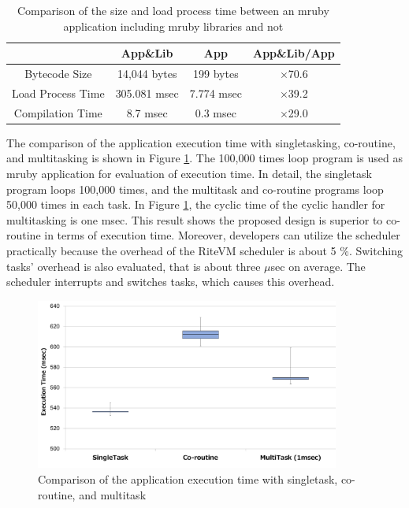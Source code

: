 \documentclass[a4j,12pt,oneside,openany,english]{jsbook}
\begin{document}
\begin{table}[t]
    \centering
    \caption{Comparison of the size and load process time between an mruby application including mruby libraries and not}
    \begin{tabular}{c||c|c|c}
                            & App\&Lib     & App        &   App\&Lib/App  \\ \hline
          Bytecode Size     & 14,044 bytes & 199 bytes  &   $\times$70.6          \\ %
          Load Process Time & 305.081 msec & 7.774 msec &   $\times$39.2          \\
          Compilation Time  & 8.7 msec     & 0.3 msec   &   $\times$29.0          \\
    \end{tabular}
    \label{tab:size_and_time}
\end{table}

The comparison of the application execution time with singletasking, co-routine, and multitasking is shown in Figure \ref{fig:comparison_s_c_m}.
The 100,000 times loop program is used as mruby application for evaluation of execution time.
In detail, the singletask program loops 100,000 times, and the multitask and co-routine programs loop 50,000 times in each task.
In Figure \ref{fig:comparison_s_c_m}, the cyclic time of the cyclic handler for multitasking is one msec.
This result shows the proposed design is superior to co-routine in terms of execution time.
Moreover, developers can utilize the scheduler practically because the overhead of the RiteVM scheduler is about 5 \%.
Switching tasks' overhead is also evaluated, that is about three $\mu$sec on average.
The scheduler interrupts and switches tasks, which causes this overhead.


\begin{figure}[t]
    \centering
    \includegraphics[width=10cm,clip]{../EMSOFT2016/figure/comparison_s_c_m.pdf}
    \caption{Comparison of the application execution time with singletask, co-routine, and multitask}
    \label{fig:comparison_s_c_m}
\end{figure}
\end{document}
